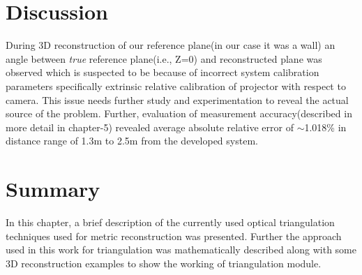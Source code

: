 \section{Discussion}
During 3D reconstruction of our reference plane(in our case it was a wall) an angle between \textit{true} reference plane(i.e., Z=0) and reconstructed plane was observed which is suspected to be because of incorrect system calibration parameters specifically extrinsic relative calibration of projector with respect to camera. This issue needs further study and experimentation to reveal the actual source of the problem.\newline
Further, evaluation of measurement accuracy(described in more detail in chapter-5) revealed average absolute relative error of $\sim$1.018\% in distance range of 1.3m to 2.5m from the developed system.   

\section{Summary}
In this chapter, a brief description of the currently used optical triangulation techniques used for metric reconstruction was presented. Further the approach used in this work for triangulation was mathematically described along with some 3D reconstruction examples to show the working of triangulation module.
